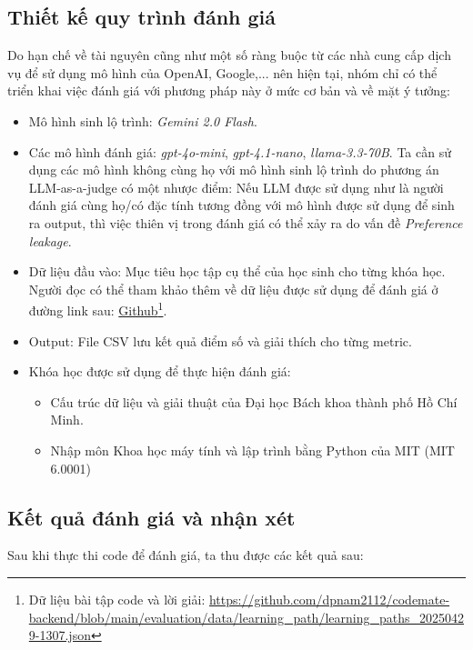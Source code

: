 \subsection{Thiết kế quy trình đánh giá}
Do hạn chế về tài nguyên cũng như một số ràng buộc từ các nhà cung cấp dịch vụ để sử dụng mô hình của OpenAI, Google,... nên hiện tại, nhóm chỉ có thể triển khai việc đánh giá với phương pháp này ở mức cơ bản và về mặt ý tưởng:
\begin{itemize}
    \item Mô hình sinh lộ trình: \emph{Gemini 2.0 Flash}.
    \item Các mô hình đánh giá: \emph{gpt-4o-mini}, \emph{gpt-4.1-nano}, \emph{llama-3.3-70B}. Ta cần sử dụng các mô hình không cùng họ với mô hình sinh lộ trình do phương án LLM-as-a-judge có một nhược điểm: Nếu LLM được sử dụng như là người đánh giá cùng họ/có đặc tính tương đồng với mô hình được sử dụng để sinh ra output, thì việc thiên vị trong đánh giá có thể xảy ra do vấn đề \emph{Preference leakage}\cite{li2025preferenceleakagecontaminationproblem}.
    \item Dữ liệu đầu vào: Mục tiêu học tập cụ thể của học sinh cho từng khóa học. Người đọc có thể tham khảo thêm về dữ liệu được sử dụng để đánh giá ở đường link sau: \href{https://github.com/dpnam2112/codemate-backend/blob/main/evaluation/data/learning_path/learning_paths_20250429-1307.json}{Github}\footnote{Dữ liệu bài tập code và lời giải: \url{https://github.com/dpnam2112/codemate-backend/blob/main/evaluation/data/learning_path/learning_paths_20250429-1307.json}}.
    \item Output: File CSV lưu kết quả điểm số và giải thích cho từng metric.
    \item Khóa học được sử dụng để thực hiện đánh giá:
    \begin{itemize}
        \item Cấu trúc dữ liệu và giải thuật của Đại học Bách khoa thành phố Hồ Chí Minh.
        \item Nhập môn Khoa học máy tính và lập trình bằng Python của MIT (MIT 6.0001)
    \end{itemize}
\end{itemize}

\subsection{Kết quả đánh giá và nhận xét}

Sau khi thực thi code để đánh giá, ta thu được các kết quả sau:

